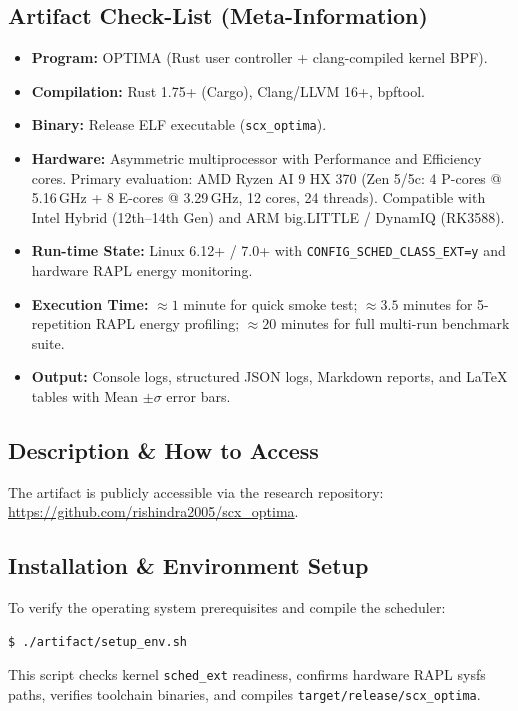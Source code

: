 \documentclass[conference]{IEEEtran}
\begin{document}
\subsection{Artifact Check-List (Meta-Information)}
\begin{itemize}
    \item \textbf{Program:} OPTIMA (Rust user controller + clang-compiled kernel BPF).
    \item \textbf{Compilation:} Rust 1.75+ (Cargo), Clang/LLVM 16+, bpftool.
    \item \textbf{Binary:} Release ELF executable (\texttt{scx\_optima}).
    \item \textbf{Hardware:} Asymmetric multiprocessor with Performance and Efficiency cores. Primary evaluation: AMD Ryzen AI 9 HX 370 (Zen 5/5c: 4 P-cores @ 5.16\,GHz + 8 E-cores @ 3.29\,GHz, 12 cores, 24 threads). Compatible with Intel Hybrid (12th--14th Gen) and ARM big.LITTLE / DynamIQ (RK3588).
    \item \textbf{Run-time State:} Linux 6.12+ / 7.0+ with \texttt{CONFIG\_SCHED\_CLASS\_EXT=y} and hardware RAPL energy monitoring.
    \item \textbf{Execution Time:} $\approx 1$ minute for quick smoke test; $\approx 3.5$ minutes for 5-repetition RAPL energy profiling; $\approx 20$ minutes for full multi-run benchmark suite.
    \item \textbf{Output:} Console logs, structured JSON logs, Markdown reports, and LaTeX tables with Mean $\pm \sigma$ error bars.
\end{itemize}

\subsection{Description \& How to Access}
The artifact is publicly accessible via the research repository:\\
\url{https://github.com/rishindra2005/scx_optima}.

\subsection{Installation \& Environment Setup}
To verify the operating system prerequisites and compile the scheduler:
\begin{verbatim}
$ ./artifact/setup_env.sh
\end{verbatim}
This script checks kernel \texttt{sched\_ext} readiness, confirms hardware RAPL sysfs paths, verifies toolchain binaries, and compiles \texttt{target/release/scx\_optima}.
\end{document}
